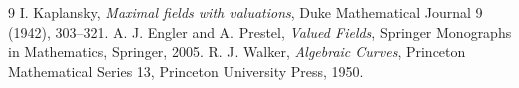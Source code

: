 \documentclass[11pt]{article}
\theoremstyle{proofnote}
\begin{document}
\begin{thebibliography}{9}
  I. Kaplansky, \emph{Maximal fields with valuations},
  Duke Mathematical Journal 9 (1942), 303--321.
  A. J. Engler and A. Prestel, \emph{Valued Fields},
  Springer Monographs in Mathematics, Springer, 2005.
  R. J. Walker, \emph{Algebraic Curves},
  Princeton Mathematical Series 13, Princeton University Press, 1950.
\end{thebibliography}
\end{document}
